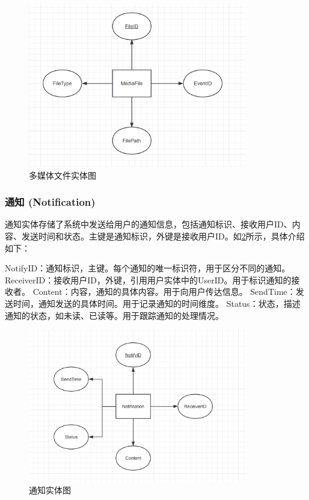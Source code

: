 \begin{figure}[h!]
    \centering
    \includegraphics[width=0.85\textwidth]{figures/db-img-03.png}
    \caption{多媒体文件实体图}
    \label{fig:entity-mediafile}
\end{figure}

\subsubsection{通知 (Notification)}

通知实体存储了系统中发送给用户的通知信息，包括通知标识、接收用户ID、内容、发送时间和状态。主键是通知标识，外键是接收用户ID。如\cref{fig:entity-notification}所示，具体介绍如下：

NotifyID：通知标识，主键。每个通知的唯一标识符，用于区分不同的通知。
ReceiverID：接收用户ID，外键，引用用户实体中的UserID。用于标识通知的接收者。
Content：内容，通知的具体内容。用于向用户传达信息。
SendTime：发送时间，通知发送的具体时间。用于记录通知的时间维度。
Status：状态，描述通知的状态，如未读、已读等。用于跟踪通知的处理情况。

\begin{figure}[h!]
    \centering
    \includegraphics[width=0.85\textwidth]{figures/db-img-04.png}
    \caption{通知实体图}
    \label{fig:entity-notification}
\end{figure}


